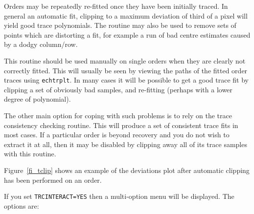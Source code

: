 \documentclass[twoside,11pt]{article}
\newcommand{\htmlref}[2]{#1}
\renewcommand{\_}{\texttt{\symbol{95}}}
\newcommand{\sunspec}[2]{#1}
\newcommand{\myindex}[1]{\index{#1}}
\newcommand{\sunspec}[2]{#2}
\newcommand{\myindex}[1]{}
\begin{document}
Orders may be repeatedly re-fitted once they have been initially traced.
In general an automatic fit, clipping to a maximum deviation of third of
a pixel will yield good trace polynomials. The routine may also be used
to remove sets of points which are distorting a fit, for example a run
of bad centre estimates caused by a dodgy column/row.

This routine should be used manually on single orders when they are
clearly not correctly fitted. This will usually be seen by viewing the
paths of the fitted order traces using
\htmlref{{\tt ech\_trplt}}{ech_trplt}\@. In many cases
it will be possible to get a good trace fit by clipping a set of obviously
bad samples, and re-fitting (perhaps with a lower degree of polynomial).

The other main option for coping with such problems is to rely on the trace
consistency checking routine.  This will produce a set of consistent
trace fits in most cases.
\myindex{Order!disabling}
If a particular order is beyond recovery and you do not wish to extract it
at all, then it may be disabled by clipping away all of its trace samples
with this routine.

\sunspec{Figure~\ref{fi_tclip}}{The figure above}
shows an example of the deviations plot after
automatic clipping has been performed on an order.

If you set {\tt TRC\_INTERACT=YES} then a multi-option menu will be displayed.
The options are:
\end{document}
